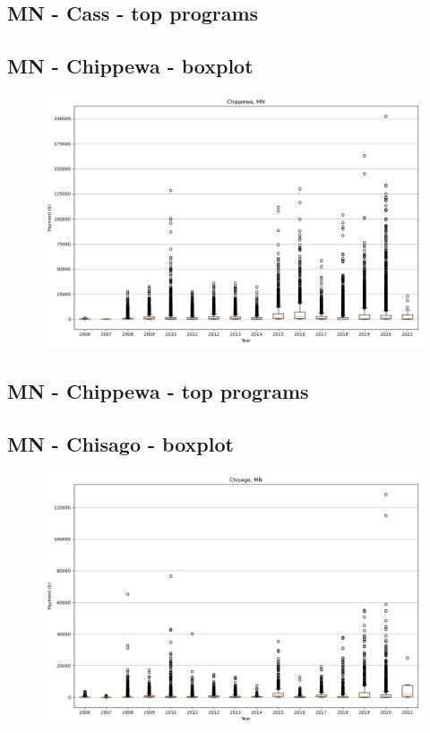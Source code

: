 \subsection*{MN - Cass - top programs}

\newpage
\subsection*{MN - Chippewa - boxplot}
\begin{figure}[h]
\centering
\includegraphics[width=7in]{../output/boxplots/counties/Chippewa-MN_boxplot.png}
\end{figure}


\subsection*{MN - Chippewa - top programs}

\newpage
\subsection*{MN - Chisago - boxplot}
\begin{figure}[h]
\centering
\includegraphics[width=7in]{../output/boxplots/counties/Chisago-MN_boxplot.png}
\end{figure}


